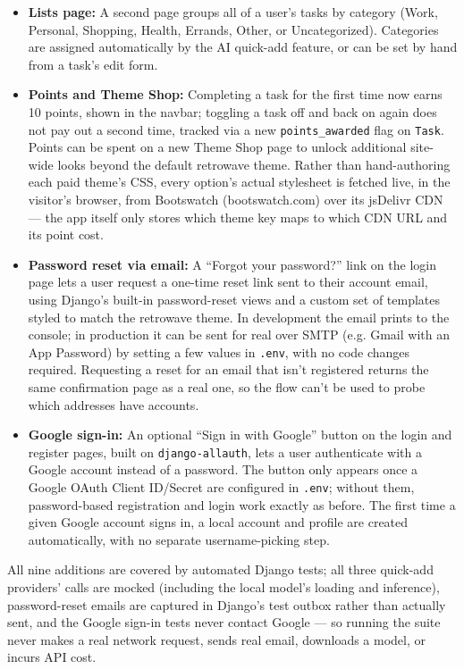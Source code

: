 \documentclass[11pt]{article}
\begin{document}
\begin{itemize}
  \item \textbf{Lists page:} A second page groups all of a user's tasks by category (Work, Personal, Shopping, Health, Errands, Other, or Uncategorized). Categories are assigned automatically by the AI quick-add feature, or can be set by hand from a task's edit form.
  \item \textbf{Points and Theme Shop:} Completing a task for the first time now earns 10 points, shown in the navbar; toggling a task off and back on again does not pay out a second time, tracked via a new \texttt{points\_awarded} flag on \texttt{Task}. Points can be spent on a new Theme Shop page to unlock additional site-wide looks beyond the default retrowave theme. Rather than hand-authoring each paid theme's CSS, every option's actual stylesheet is fetched live, in the visitor's browser, from Bootswatch (bootswatch.com) over its jsDelivr CDN --- the app itself only stores which theme key maps to which CDN URL and its point cost.
  \item \textbf{Password reset via email:} A ``Forgot your password?'' link on the login page lets a user request a one-time reset link sent to their account email, using Django's built-in password-reset views and a custom set of templates styled to match the retrowave theme. In development the email prints to the console; in production it can be sent for real over SMTP (e.g. Gmail with an App Password) by setting a few values in \texttt{.env}, with no code changes required. Requesting a reset for an email that isn't registered returns the same confirmation page as a real one, so the flow can't be used to probe which addresses have accounts.
  \item \textbf{Google sign-in:} An optional ``Sign in with Google'' button on the login and register pages, built on \texttt{django-allauth}, lets a user authenticate with a Google account instead of a password. The button only appears once a Google OAuth Client ID/Secret are configured in \texttt{.env}; without them, password-based registration and login work exactly as before. The first time a given Google account signs in, a local account and profile are created automatically, with no separate username-picking step.
\end{itemize}

All nine additions are covered by automated Django tests; all three quick-add providers' calls are mocked (including the local model's loading and inference), password-reset emails are captured in Django's test outbox rather than actually sent, and the Google sign-in tests never contact Google --- so running the suite never makes a real network request, sends real email, downloads a model, or incurs API cost.
\end{document}
